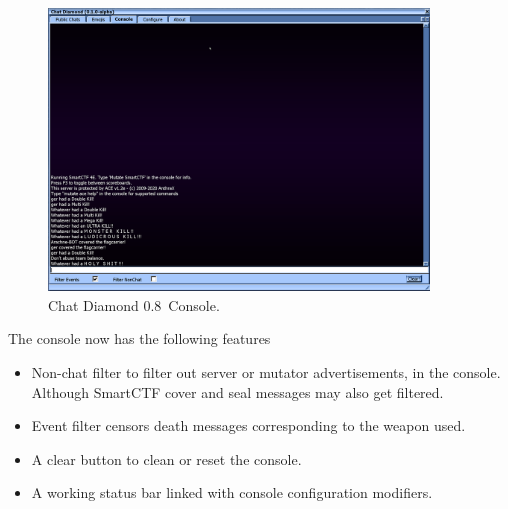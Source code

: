 \documentclass{article}
\theoremstyle{definition}
\newcommand{\ChatDiamondVersion}{0.8}
\begin{document}
\begin{figure}
\centering
\includegraphics[width=0.9\textwidth]{img_console}
\caption{Chat Diamond \ChatDiamondVersion~Console.}
\label{fig:chatdiamond_console}
\end{figure}

The console now has the following features
\begin{itemize}
\label{itemz:consolefeatures}
\item Non-chat filter to filter out server or mutator advertisements, in the console. Although SmartCTF cover and seal messages may also get filtered.
\item Event filter censors death messages corresponding to the weapon used.
\item A clear button to clean or reset the console.
\item A working status bar linked with console configuration modifiers.
\end{itemize}
\end{document}

